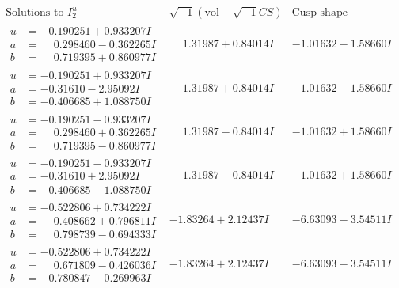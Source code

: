 \documentclass[1p]{elsarticle_modified}
\theoremstyle{definition}
\newcommand{\I}{\sqrt{-1}}
\begin{document}
$$\begin{array}{c|c|c}  
\text{Solutions to }I^u_{2}& \I (\text{vol} + \sqrt{-1}CS) & \text{Cusp shape}\\
 \hline 
\begin{aligned}
u &= -0.190251 + 0.933207 I \\
a &= \phantom{-}0.298460 - 0.362265 I \\
b &= \phantom{-}0.719395 + 0.860977 I\end{aligned}
 & \phantom{-}1.31987 + 0.84014 I & -1.01632 - 1.58660 I \\ \hline\begin{aligned}
u &= -0.190251 + 0.933207 I \\
a &= -0.31610 - 2.95092 I \\
b &= -0.406685 + 1.088750 I\end{aligned}
 & \phantom{-}1.31987 + 0.84014 I & -1.01632 - 1.58660 I \\ \hline\begin{aligned}
u &= -0.190251 - 0.933207 I \\
a &= \phantom{-}0.298460 + 0.362265 I \\
b &= \phantom{-}0.719395 - 0.860977 I\end{aligned}
 & \phantom{-}1.31987 - 0.84014 I & -1.01632 + 1.58660 I \\ \hline\begin{aligned}
u &= -0.190251 - 0.933207 I \\
a &= -0.31610 + 2.95092 I \\
b &= -0.406685 - 1.088750 I\end{aligned}
 & \phantom{-}1.31987 - 0.84014 I & -1.01632 + 1.58660 I \\ \hline\begin{aligned}
u &= -0.522806 + 0.734222 I \\
a &= \phantom{-}0.408662 + 0.796811 I \\
b &= \phantom{-}0.798739 - 0.694333 I\end{aligned}
 & -1.83264 + 2.12437 I & -6.63093 - 3.54511 I \\ \hline\begin{aligned}
u &= -0.522806 + 0.734222 I \\
a &= \phantom{-}0.671809 - 0.426036 I \\
b &= -0.780847 - 0.269963 I\end{aligned}
 & -1.83264 + 2.12437 I & -6.63093 - 3.54511 I \\ \hline\begin{aligned}

\end{aligned}
\end{array}$$
\end{document}
